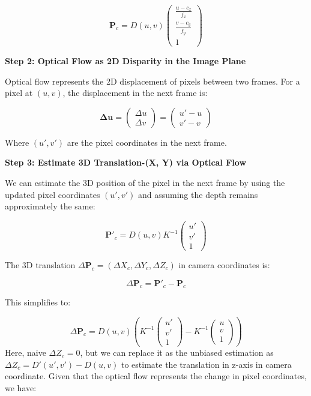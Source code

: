 \[
\mathbf{P}_c = D(u, v) \begin{pmatrix}
	\frac{u - c_x}{f_x} \\
	\frac{v - c_y}{f_y} \\
	1
\end{pmatrix}
\]

\textbf{Step 2: Optical Flow as 2D Disparity in the Image Plane}

Optical flow represents the 2D displacement of pixels between two frames. For a pixel at \((u, v)\), the displacement in the next frame is:

\[
\mathbf{\Delta u} = \begin{pmatrix} \Delta u \\ \Delta v \end{pmatrix} = \begin{pmatrix} u' - u \\ v' - v \end{pmatrix}
\]

Where \( (u', v') \) are the pixel coordinates in the next frame.

\textbf{Step 3: Estimate 3D Translation-(X, Y) via Optical Flow}

We can estimate the 3D position of the pixel in the next frame by using the updated pixel coordinates \((u', v')\) and assuming the depth remains approximately the same:

\[
\mathbf{P}'_c = D(u, v) K^{-1} \begin{pmatrix} u' \\ v' \\ 1 \end{pmatrix}
\]

The 3D translation \( \Delta \mathbf{P}_c = ( \Delta X_c, \Delta Y_c, \Delta Z_c ) \) in camera coordinates is:

\[
\Delta \mathbf{P}_c = \mathbf{P}'_c - \mathbf{P}_c
\]

This simplifies to:

\[
\Delta \mathbf{P}_c = D(u, v) \left( K^{-1} \begin{pmatrix} u' \\ v' \\ 1 \end{pmatrix} - K^{-1} \begin{pmatrix} u \\ v \\ 1 \end{pmatrix} \right)
\]
Here, naive $\Delta Z_c = 0$, but we can replace it as the unbiased estimation as $\Delta Z_c = D'(u', v') - D(u, v)$ to estimate the translation in z-axis in camera coordinate.
Given that the optical flow represents the change in pixel coordinates, we have:

